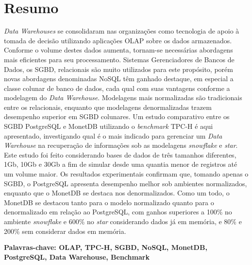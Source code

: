 
\chapter*{Resumo}

\noindent

\textit{Data Warehouses} se consolidaram nas organizações como tecnologia de apoio à tomada de decisão utilizando aplicações OLAP sobre os dados armazenados. Conforme o volume destes dados aumenta, tornam-se necessárias abordagens mais eficientes para seu processamento. Sistemas Gerenciadores de Bancos de Dados, os SGBD, relacionais são muito utilizados para este propósito, porém novas abordagens denominadas NoSQL têm ganhado destaque, em especial a classe colunar de banco de dados, cada qual com suas vantagens conforme a modelagem do \textit{Data Warehouse}. Modelagens mais normalizadas são tradicionais entre os relacionais, enquanto que modelagens denormalizadas trazem desempenho superior em SGBD colunares. Um estudo comparativo entre os SGBD PostgreSQL e MonetDB utilizando o \textit{benchmark} TPC-H é aqui apresentado, investigando qual é o mais indicado para gerenciar um \textit{Data Warehouse} na recuperação de informações sob as modelagens \textit{snowflake} e \textit{star}. Este estudo foi feito considerando bases de dados de três tamanhos diferentes, 1Gb, 10Gb e 30Gb a fim de simular desde uma quantia menor de registros até um volume maior. Os resultados experimentais confirmam que, tomando apenas o SGBD, o PostgreSQL apresenta desempenho melhor sob ambientes normalizados, enquanto que o MonetDB se destaca nos denormalizados. Como um todo, o MonetDB se destacou tanto para o modelo normalizado quanto para o denormalizado em relação ao PostgreSQL, com ganhos superiores a 100\% no ambiente \textit{snowflake} e 600\% no \textit{star} considerando dados já em memória, e 80\% e 200\% sem considerar dados em memória.


\vspace{1cm}
\noindent
\textbf{Palavras-chave: OLAP, TPC-H, SGBD, NoSQL, MonetDB, PostgreSQL, Data Warehouse, Benchmark}


